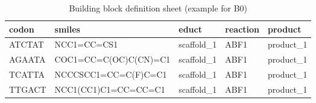 \begin{table}[htbp]
\centering
\caption{Building block definition sheet (example for B0)}
\label{tab:table7}
\begin{tabular}{lllll}
\toprule
codon & smiles & educt & reaction & product \\
\midrule
ATCTAT & NCC1=CC=CS1 & scaffold\_1 & ABF1 & product\_1 \\
AGAATA & COC1=CC=C(OC)C(CN)=C1 & scaffold\_1 & ABF1 & product\_1 \\
TCATTA & NCCCSCC1=CC=C(F)C=C1 & scaffold\_1 & ABF1 & product\_1 \\
TTGACT & NCC1(CC1)C1=CC=CC=C1 & scaffold\_1 & ABF1 & product\_1 \\
\bottomrule
\end{tabular}
\end{table}